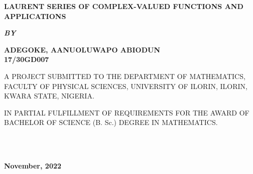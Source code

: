 \documentclass[12pt]{report}
\newcommand{\bt}[1]{\textbf{#1}}
\begin{document}
	
	\clearpage
	\thispagestyle{empty}
	\begin{center}
		\Large \bt{LAURENT SERIES OF COMPLEX-VALUED FUNCTIONS AND APPLICATIONS}
	\end{center}

	\hspace{7cm}
	
	\begin{center}
		\textbf{\textit{BY}}
	\end{center}
	
	\hspace{5cm}
	
	\begin{center}
		\large \textbf{ADEGOKE, AANUOLUWAPO ABIODUN
			\\
			17/30GD007}
	\end{center}
	
	\hspace{9cm}
	
	\begin{center}
		A PROJECT SUBMITTED TO THE DEPARTMENT OF MATHEMATICS, FACULTY OF PHYSICAL SCIENCES, UNIVERSITY OF ILORIN, ILORIN, KWARA STATE, NIGERIA.
	\end{center}

	\hspace{7cm}
	
	\begin{center}
		IN PARTIAL FULFILLMENT OF REQUIREMENTS FOR THE AWARD OF BACHELOR OF SCIENCE (B. Sc.) DEGREE IN MATHEMATICS.
	\end{center}
	\hspace{5cm}
	\\ \\ 
	\begin{center}
		\textbf{November, 2022}
	\end{center}

	\newpage
\end{document}
